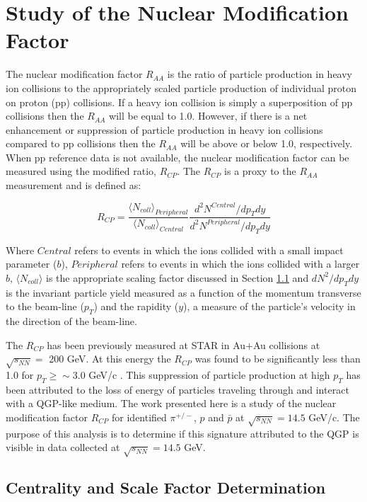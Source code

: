 \section{Study of the Nuclear Modification Factor}
	The nuclear modification factor $R_{AA}$ is the ratio of particle production in heavy ion collisions to the appropriately scaled particle production of individual proton on proton (pp) collisions. If a heavy ion collision is simply a superposition of pp collisions then the $R_{AA}$ will be equal to 1.0. However, if there is a net enhancement or suppression of particle production in heavy ion collisions compared to pp collisions then the $R_{AA}$ will be above or below 1.0, respectively. When pp reference data is not available, the nuclear modification factor can be measured using the modified ratio, $R_{CP}$. The $R_{CP}$ is a proxy to the $R_{AA}$ measurement and is defined as:

	\begin{equation}
		R_{CP} = \frac{ \langle N_{coll} \rangle_{Peripheral} } {  \langle N_{coll} \rangle_{Central} } \frac{ d^2 N^{Central} / dp_{T}dy } { d^2 N^{Peripheral} / dp_{T}dy }
		\label{eq:r_cp}
	\end{equation}

	Where $Central$ refers to events in which the ions collided with a small impact parameter ($b$), $Peripheral$ refers to events in which the ions collided with a larger $b$, $\langle N_{coll} \rangle $ is the appropriate scaling factor discussed in Section \ref{sec:mc_glauber} and $dN^2/dp_T dy$ is the invariant particle yield measured as a function of the momentum transverse to the beam-line ($p_T$) and the rapidity ($y$), a measure of the particle's velocity in the direction of the beam-line. 

	The $R_{CP}$ has been previously measured at STAR in Au$+$Au collisions at $\sqrt{s_{NN}}=$ 200 GeV. At this energy the $R_{CP}$ was found to be significantly less than 1.0 for $p_T \geq \sim$3.0 GeV/c \cite{}. This suppression of particle production at high $p_T$ has been attributed to the loss of energy of particles traveling through and interact with a QGP-like medium. The work presented here is a study of the nuclear modification factor $R_{CP}$ for identified $\pi^{+/-}$, $p$ and $\bar{p}$ at $\sqrt{s_{NN}}=14.5$ GeV/c. The purpose of this analysis is to determine if this signature attributed to the QGP is visible in data collected at $\sqrt{s_{NN}}=14.5$ GeV.


\subsection{ Centrality and Scale Factor Determination }
	\label{sec:mc_glauber}

